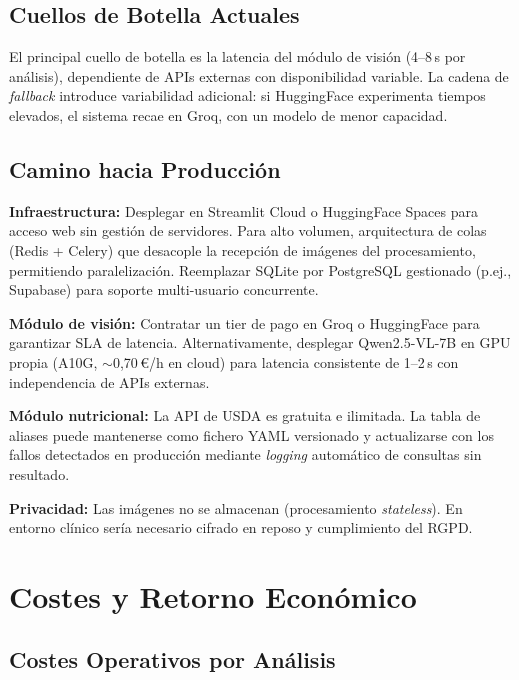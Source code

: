 \documentclass[10pt,a4paper]{article}
\begin{document}
\subsection{Cuellos de Botella Actuales}

El principal cuello de botella es la latencia del módulo de visión (4–8\,s por análisis), dependiente
de APIs externas con disponibilidad variable. La cadena de \textit{fallback} introduce variabilidad
adicional: si HuggingFace experimenta tiempos elevados, el sistema recae en Groq, con un modelo de
menor capacidad.

\subsection{Camino hacia Producción}

\textbf{Infraestructura:} Desplegar en Streamlit Cloud o HuggingFace Spaces para acceso web sin
gestión de servidores. Para alto volumen, arquitectura de colas (Redis + Celery) que desacople la
recepción de imágenes del procesamiento, permitiendo paralelización. Reemplazar SQLite por
PostgreSQL gestionado (p.ej., Supabase) para soporte multi-usuario concurrente.

\textbf{Módulo de visión:} Contratar un tier de pago en Groq o HuggingFace para garantizar SLA de
latencia. Alternativamente, desplegar Qwen2.5-VL-7B en GPU propia (A10G, $\sim$0,70\,€/h en
cloud) para latencia consistente de 1–2\,s con independencia de APIs externas.

\textbf{Módulo nutricional:} La API de USDA es gratuita e ilimitada. La tabla de aliases puede
mantenerse como fichero YAML versionado y actualizarse con los fallos detectados en producción
mediante \textit{logging} automático de consultas sin resultado.

\textbf{Privacidad:} Las imágenes no se almacenan (procesamiento \textit{stateless}). En entorno
clínico sería necesario cifrado en reposo y cumplimiento del RGPD.

\section{Costes y Retorno Económico}

\subsection{Costes Operativos por Análisis}
\end{document}
